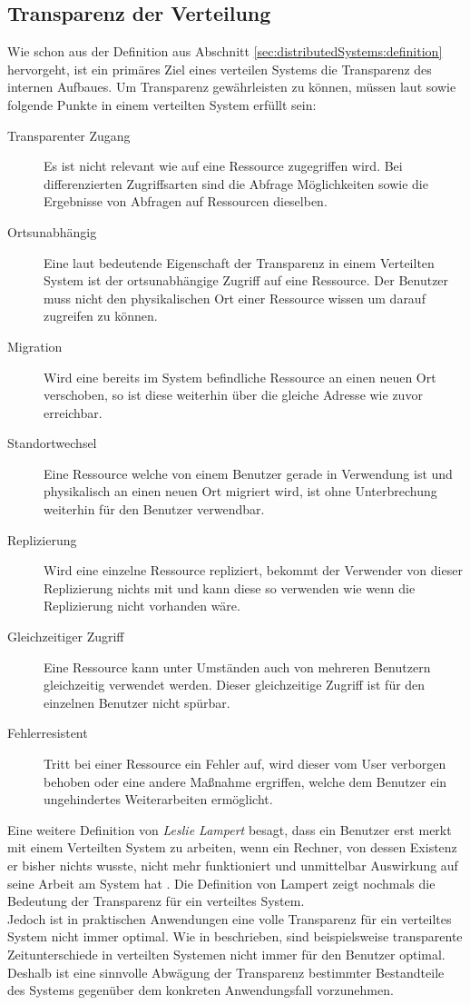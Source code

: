 \subsection{Transparenz der Verteilung}\label{sec:distributedSystems:goales:Transperency} Wie schon aus der Definition aus Abschnitt \ref{sec:distributedSystems:definition} hervorgeht, ist ein primäres Ziel eines verteilen Systems die Transparenz des internen Aufbaues. Um Transparenz gewährleisten zu können, müssen laut \cite{iec1995open} sowie \cite{tanenbaum2007distributed} folgende Punkte in einem verteilten System erfüllt sein:
\begin{description}
  \item[Transparenter Zugang] Es ist nicht relevant wie auf eine Ressource zugegriffen wird. Bei differenzierten Zugriffsarten sind die Abfrage Möglichkeiten sowie die Ergebnisse von Abfragen auf Ressourcen dieselben.
  \item[Ortsunabhängig] Eine laut \cite{tanenbaum2007distributed} bedeutende Eigenschaft der Transparenz in einem Verteilten System ist der ortsunabhängige Zugriff auf eine Ressource. Der Benutzer muss nicht den physikalischen Ort einer Ressource wissen um darauf zugreifen zu können. 
  \item[Migration] Wird eine bereits im System befindliche Ressource an einen neuen Ort verschoben, so ist diese weiterhin über die gleiche Adresse wie zuvor erreichbar.
  \item [Standortwechsel] Eine Ressource welche von einem Benutzer gerade in Verwendung ist und physikalisch an einen neuen Ort migriert wird, ist ohne Unterbrechung weiterhin für den Benutzer verwendbar.
  \item[Replizierung] Wird eine einzelne Ressource repliziert, bekommt der Verwender von dieser Replizierung nichts mit und kann diese so verwenden wie wenn die Replizierung nicht vorhanden wäre. 
  \item[Gleichzeitiger Zugriff] Eine Ressource kann unter Umständen auch von mehreren Benutzern gleichzeitig verwendet werden. Dieser gleichzeitige Zugriff ist für den einzelnen Benutzer nicht spürbar.
  \item[Fehlerresistent] Tritt bei einer Ressource ein Fehler auf, wird dieser vom User verborgen behoben oder eine andere Maßnahme ergriffen, welche dem Benutzer ein ungehindertes Weiterarbeiten ermöglicht.
\end{description}
Eine weitere Definition von \textit{Leslie Lampert} besagt, dass ein Benutzer erst merkt mit einem Verteilten System zu arbeiten, wenn ein Rechner, von dessen Existenz er bisher nichts wusste, nicht mehr funktioniert und unmittelbar Auswirkung auf seine Arbeit am System hat \citep{Schroeder:1993}. Die Definition von Lampert zeigt nochmals die Bedeutung der Transparenz für ein verteiltes System. \\
Jedoch ist in praktischen Anwendungen eine volle Transparenz für ein verteiltes System nicht immer optimal. Wie in \cite{tanenbaum2007distributed} beschrieben, sind beispielsweise transparente Zeitunterschiede in verteilten Systemen nicht immer für den Benutzer optimal. Deshalb ist eine sinnvolle Abwägung der Transparenz bestimmter Bestandteile des Systems gegenüber dem konkreten Anwendungsfall vorzunehmen. 

